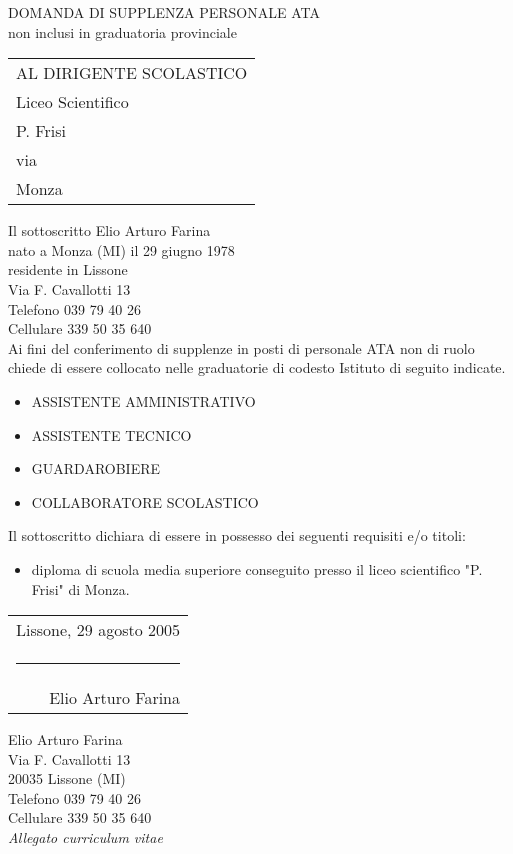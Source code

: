 \documentclass[12pt,a4paper]{article}
\newcommand{\tiposcuola}{Liceo Scientifico\\
P. Frisi}
\newcommand{\indirizzo}{via}
\newcommand{\citta}{Monza}
\begin{document}
\begin{center}
{\Large DOMANDA DI SUPPLENZA PERSONALE ATA}\\
\vspace{5pt}
{\large non inclusi in graduatoria provinciale}
\end{center}


\vspace{1cm}
\begin{flushright}
\begin{tabular}{l}
AL DIRIGENTE SCOLASTICO\\
\tiposcuola\\
\indirizzo\\
\citta\\
\end{tabular}
\end{flushright}


\vspace{1cm}
\noindent
Il sottoscritto Elio Arturo Farina\\
nato a Monza (MI) il 29 giugno 1978\\
residente in Lissone\\
Via F. Cavallotti 13\\
Telefono 039 79 40 26\\
Cellulare 339 50 35 640\\


\vspace{0.5cm}
Ai fini del conferimento di supplenze in posti di personale ATA non di ruolo chiede di essere collocato nelle graduatorie di codesto Istituto di seguito indicate.

\begin{itemize}
\item ASSISTENTE AMMINISTRATIVO
\item ASSISTENTE TECNICO
\item GUARDAROBIERE
\item COLLABORATORE SCOLASTICO
\end{itemize}

\vspace{1cm}
\noindent
Il sottoscritto dichiara di essere in possesso dei seguenti requisiti e/o titoli:
\begin{itemize}
\item diploma di scuola media superiore conseguito presso il liceo scientifico "P. Frisi" di Monza.
\end{itemize}

\vfill
\begin{flushright}
\begin{tabular}{r}
Lissone, 29 agosto 2005\\[25pt]
\rule{250pt}{0.5pt}\\[-4pt]
\small{Elio Arturo Farina}
\end{tabular}
\end{flushright}


\vfill
\noindent
Elio Arturo Farina\\
Via F. Cavallotti 13\\
20035 Lissone (MI)\\
Telefono 039 79 40 26\\
Cellulare 339 50 35 640\\

\noindent
{\em Allegato curriculum vitae}
\end{document}
